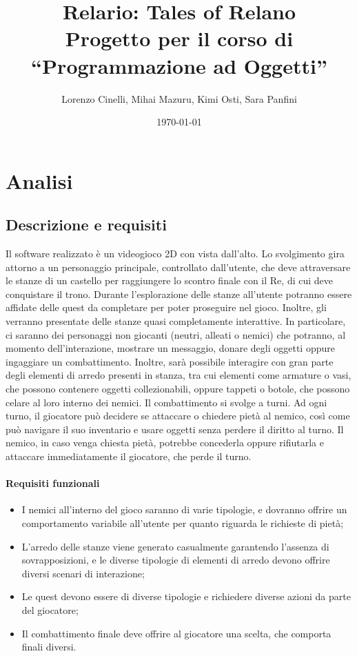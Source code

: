 \documentclass[a4paper,12pt]{report}
\title{Relario: Tales of Relano\\Progetto per il corso di\\``Programmazione ad Oggetti''}
\author{Lorenzo Cinelli, Mihai Mazuru, Kimi Osti, Sara Panfini}
\date{\today}
\begin{document}
\maketitle

\tableofcontents

\chapter{Analisi}


\section{Descrizione e requisiti}

Il software realizzato è un videogioco 2D con vista dall’alto. Lo svolgimento gira attorno a un personaggio principale, controllato dall’utente, che deve attraversare le stanze di un castello per raggiungere lo scontro finale con il Re, di cui deve conquistare il trono.
%
\newline Durante l’esplorazione delle stanze all’utente potranno essere affidate delle quest da completare per poter proseguire nel gioco.
%
\newline Inoltre, gli verranno presentate delle stanze quasi completamente interattive. In particolare, ci saranno dei personaggi non giocanti (neutri, alleati o nemici) che potranno, al momento dell’interazione, mostrare un messaggio, donare degli oggetti oppure ingaggiare un combattimento. Inoltre, sarà possibile interagire con gran parte degli elementi di arredo presenti in stanza, tra cui elementi come armature o vasi, che possono contenere oggetti collezionabili, oppure tappeti o botole, che possono celare al loro interno dei nemici.
%
\newline Il combattimento si svolge a turni. Ad ogni turno, il giocatore può decidere se attaccare o chiedere pietà al nemico, così come può navigare il suo inventario e usare oggetti senza perdere il diritto al turno. Il nemico, in caso venga chiesta pietà, potrebbe concederla oppure rifiutarla e attaccare immediatamente il giocatore, che perde il turno. 

\subsubsection{Requisiti funzionali}
\begin{itemize}
	\item I nemici all'interno del gioco saranno di varie tipologie, e dovranno offrire un comportamento variabile all'utente per quanto riguarda le richieste di pietà;
	\item L'arredo delle stanze viene generato casualmente garantendo l'assenza di sovrapposizioni, e le diverse tipologie di elementi di arredo devono offrire diversi scenari di interazione;
	\item Le quest devono essere di diverse tipologie e richiedere diverse azioni da parte del giocatore;
	\item Il combattimento finale deve offrire al giocatore una scelta, che comporta finali diversi.
\end{itemize}
\end{document}
